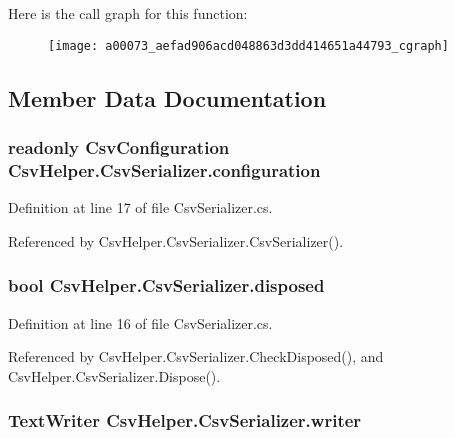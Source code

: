 Here is the call graph for this function\-:
\nopagebreak
\begin{figure}[H]
\begin{center}
\leavevmode
\texttt{[image: a00073\_aefad906acd048863d3dd414651a44793\_cgraph]}
\end{center}
\end{figure}




\subsection{Member Data Documentation}
\hypertarget{a00073_ae8c56ff97c0a797245f2205c486833ea}{
\subsubsection[{configuration}]{\setlength{\rightskip}{0pt plus 5cm}readonly {\bf Csv\-Configuration} Csv\-Helper.\-Csv\-Serializer.\-configuration\hspace{0.3cm}{\ttfamily [private]}}}\label{a00073_ae8c56ff97c0a797245f2205c486833ea}


Definition at line 17 of file Csv\-Serializer.\-cs.



Referenced by Csv\-Helper.\-Csv\-Serializer.\-Csv\-Serializer().

\hypertarget{a00073_a2687885dae7f7b0eec3c2db81c05f7e4}{
\subsubsection[{disposed}]{\setlength{\rightskip}{0pt plus 5cm}bool Csv\-Helper.\-Csv\-Serializer.\-disposed\hspace{0.3cm}{\ttfamily [private]}}}\label{a00073_a2687885dae7f7b0eec3c2db81c05f7e4}


Definition at line 16 of file Csv\-Serializer.\-cs.



Referenced by Csv\-Helper.\-Csv\-Serializer.\-Check\-Disposed(), and Csv\-Helper.\-Csv\-Serializer.\-Dispose().

\hypertarget{a00073_adfb235fa2c868fc79c0376fd12fda767}{
\subsubsection[{writer}]{\setlength{\rightskip}{0pt plus 5cm}Text\-Writer Csv\-Helper.\-Csv\-Serializer.\-writer\hspace{0.3cm}{\ttfamily [private]}}}\label{a00073_adfb235fa2c868fc79c0376fd12fda767}


